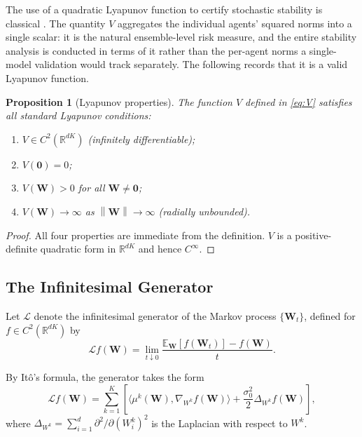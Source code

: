 \documentclass[12pt]{article}
\theoremstyle{plain}
\newtheorem{proposition}[theorem]{Proposition}
\theoremstyle{definition}
\newcommand{\R}{\mathbb{R}}
\newcommand{\E}{\mathbb{E}}
\newcommand{\Lgen}{\mathcal{L}}
\newcommand{\W}{\mathbf{W}}
\newcommand{\norm}[1]{\left\lVert #1 \right\rVert}
\newcommand{\ip}[2]{\langle #1, #2 \rangle}
\begin{document}
The use of a quadratic Lyapunov function to certify stochastic stability is classical \cite{kushner1967stochastic, khasminskii2012stochastic}. The quantity $V$ aggregates the individual agents' squared norms into a single scalar: it is the natural ensemble-level risk measure, and the entire stability analysis is conducted in terms of it rather than the per-agent norms a single-model validation would track separately. The following records that it is a valid Lyapunov function.

\begin{proposition}[Lyapunov properties]
  \label{prop:lyapunov_props}
  The function $V$ defined in \eqref{eq:V} satisfies all standard
  Lyapunov conditions:
  \begin{enumerate}[label=(\roman*)]
    \item $V \in C^2(\R^{dK})$ (infinitely differentiable);
    \item $V(\mathbf{0}) = 0$;
    \item $V(\W) > 0$ for all $\W \neq \mathbf{0}$;
    \item $V(\W) \to \infty$ as $\norm{\W} \to \infty$ (radially unbounded).
  \end{enumerate}
\end{proposition}

\begin{proof}
  All four properties are immediate from the definition.  $V$ is a
  positive-definite quadratic form in $\R^{dK}$ and hence
  $C^\infty$.
\end{proof}

\subsection{The Infinitesimal Generator}

Let $\Lgen$ denote the infinitesimal generator of the Markov process
$\{\W_t\}$, defined for $f \in C^2(\R^{dK})$ by
\begin{equation}
  \Lgen f(\W) = \lim_{t \downarrow 0} \frac{\E_\W[f(\W_t)] - f(\W)}{t}.
\end{equation}

By It\^{o}'s formula, the generator takes the form
\begin{equation}
  \Lgen f(\W) = \sum_{k=1}^K \left[
    \ip{\mu^k(\W)}{\nabla_{W^k} f(\W)}
    + \frac{\sigma_0^2}{2} \Delta_{W^k} f(\W)
  \right],
  \label{eq:generator_general}
\end{equation}
where $\Delta_{W^k} = \sum_{i=1}^d \partial^2 / \partial (W^k_i)^2$ is
the Laplacian with respect to $W^k$.
\end{document}
